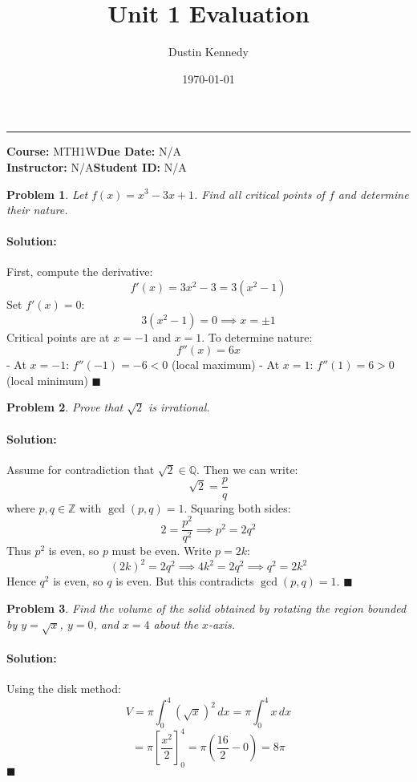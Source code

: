 \documentclass{article}
\title{\textbf{Unit 1 Evaluation}}
\author{Dustin Kennedy}
\date{\today}
\newtheorem{problem}{Problem}
\newenvironment{solution}{\paragraph{\textbf{Solution:}}}{\hfill$\blacksquare$}
\newcommand{\Q}{\mathbb{Q}}
\newcommand{\Z}{\mathbb{Z}}
\newcommand{\course}{MTH1W}
\newcommand{\instructor}{N/A}
\begin{document}
\maketitle
\hrule
\vspace{0.5cm}
\textbf{Course:} \course \hfill \textbf{Due Date:} N/A \\
\textbf{Instructor:} \instructor \hfill \textbf{Student ID:} N/A
\vspace{1cm}

\begin{problem}
  Let $f(x) = x^3 - 3x + 1$. Find all critical points of $f$ and determine their nature.
\end{problem}

\begin{solution}
  First, compute the derivative:
  \[
    f'(x) = 3x^2 - 3 = 3(x^2 - 1)
  \]
  Set $f'(x) = 0$:
  \[
    3(x^2 - 1) = 0 \implies x = \pm 1
  \]
  Critical points are at $x = -1$ and $x = 1$. To determine nature:
  \[
    f''(x) = 6x
  \]
  - At $x = -1$: $f''(-1) = -6 < 0$ (local maximum)
  - At $x = 1$: $f''(1) = 6 > 0$ (local minimum)
\end{solution}
\medskip

\begin{problem}
  Prove that $\sqrt{2}$ is irrational.
\end{problem}

\begin{solution}
  Assume for contradiction that $\sqrt{2} \in \Q$. Then we can write:
  \[
    \sqrt{2} = \frac{p}{q}
  \]
  where $p, q \in \Z$ with $\gcd(p,q) = 1$. Squaring both sides:
  \[
    2 = \frac{p^2}{q^2} \implies p^2 = 2q^2
  \]
  Thus $p^2$ is even, so $p$ must be even. Write $p = 2k$:
  \[
    (2k)^2 = 2q^2 \implies 4k^2 = 2q^2 \implies q^2 = 2k^2
  \]
  Hence $q^2$ is even, so $q$ is even. But this contradicts $\gcd(p,q) = 1$.
\end{solution}
\medskip

\begin{problem}
  Find the volume of the solid obtained by rotating the region bounded by $y = \sqrt{x}$, $y = 0$, and $x = 4$ about the $x$-axis.
\end{problem}

\begin{solution}
  Using the disk method:
  \[
    V = \pi \int_{0}^{4} (\sqrt{x})^2 \,dx = \pi \int_{0}^{4} x \,dx
  \]
  \[
    = \pi \left[ \frac{x^2}{2} \right]_{0}^{4} = \pi \left( \frac{16}{2} - 0 \right) = 8\pi
  \]
\end{solution}

\end{document}
